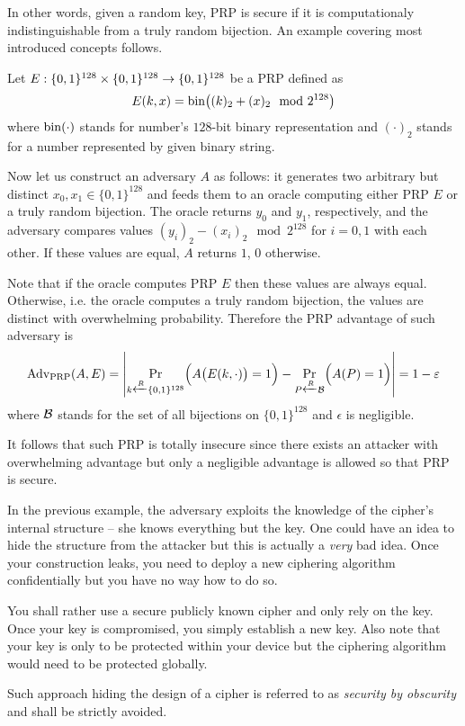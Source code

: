 In other words, given a random key, PRP is secure if it is computationaly indistinguishable from a truly random bijection. An example covering most introduced concepts follows.

\begin{example}
	Let $E:\{0,1\}^{128}\times\{0,1\}^{128}\rightarrow\{0,1\}^{128}$ be a PRP defined as
	\[
		E(k,x) = \operatorname*{bin}\bigl((k)_2 + (x)_2 \mod{2^{128}}\bigr)
	\]
	where $\operatorname*{bin}(\cdot)$ stands for number's $128$-bit binary representation and $(\cdot)_2$ stands for a number represented by given binary string.
	
	Now let us construct an adversary $A$ as follows: it generates two arbitrary but distinct $x_0,x_1\in\{0,1\}^{128}$ and feeds them to an oracle computing either PRP $E$ or a truly random bijection. The oracle returns $y_0$ and $y_1$, respectively, and the adversary compares values $(y_i)_2 - (x_i)_2 \mod{2^{128}}$ for $i=0,1$ with each other. If these values are equal, $A$ returns $1$, $0$ otherwise.
	
	Note that if the oracle computes PRP $E$ then these values are always equal. Otherwise, i.e. the oracle computes a truly random bijection, the values are distinct with overwhelming probability. Therefore the PRP advantage of such adversary is
	\[
		\operatorname*{Adv_{PRP}}(A,E) = \left| \Pr\limits_{k\xleftarrow{R} \{0,1\}^{128}}\Bigl(A\bigl(E(k,\cdot)\bigr)=1\Bigr) - \Pr\limits_{P\xleftarrow{R} {\cal B}}\Bigl(A(P)=1\Bigr) \right| = 1 - \varepsilon
	\]
	where $\cal B$ stands for the set of all bijections on $\{0,1\}^{128}$ and $\epsilon$ is negligible.
	
	It follows that such PRP is totally insecure since there exists an attacker with overwhelming advantage but only a negligible advantage is allowed so that PRP is secure.
\end{example}

\begin{note}
	In the previous example, the adversary exploits the knowledge of the cipher's internal structure -- she knows everything but the key. One could have an idea to hide the structure from the attacker but this is actually a {\em very} bad idea. Once your construction leaks, you need to deploy a new ciphering algorithm confidentially but you have no way how to do so.
	
	You shall rather use a secure publicly known cipher and only rely on the key. Once your key is compromised, you simply establish a new key. Also note that your key is only to be protected within your device but the ciphering algorithm would need to be protected globally.
	
	Such approach hiding the design of a cipher is referred to as {\em security by obscurity} and shall be strictly avoided.
\end{note}

